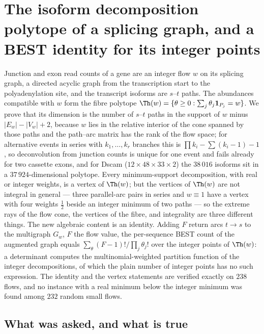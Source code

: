 \chapter[The isoform decomposition polytope]{The isoform decomposition polytope of a splicing graph, and a BEST identity for its integer points}\label{chap:ch17}
\begin{chaptersummary}
Junction and exon read counts of a gene are an integer flow $w$ on its splicing graph, a
directed acyclic graph from the transcription start to the polyadenylation site, and the
transcript isoforms are $s$--$t$ paths. The abundances compatible with $w$ form the fibre
polytope $\Th(w)=\{\theta\ge0:\sum_j\theta_j\mathbf 1_{P_j}=w\}$. We prove that its dimension
is the number of $s$--$t$ paths in the support of $w$ minus $|E_w|-|V_w|+2$, because $w$
lies in the relative interior of the cone spanned by those paths and the path--arc matrix has
the rank of the flow space; for alternative events in series with $k_1,\dots,k_r$ branches
this is $\prod k_i-\sum(k_i-1)-1$, so deconvolution from junction counts is unique for one
event and fails already for two cassette exons, and for Dscam ($12\times48\times33\times2$)
the $38\,016$ isoforms sit in a $37\,924$-dimensional polytope. Every minimum-support
decomposition, with real or integer weights, is a vertex of $\Th(w)$; but the vertices of
$\Th(w)$ are not integral in general --- three parallel-arc pairs in series and $w\equiv1$
have a vertex with four weights $\tfrac12$ beside an integer minimum of two paths --- so the
extreme rays of the flow cone, the vertices of the fibre, and integrality are three different
things. The new algebraic content is an identity. Adding $F$ return arcs $t\to s$ to the
multigraph $G_w$, $F$ the flow value, the per-sequence BEST count of the augmented graph
equals $\sum_\theta (F-1)!/\prod_j\theta_j!$ over the integer points of $\Th(w)$: a
determinant computes the multinomial-weighted partition function of the integer
decompositions, of which the plain number of integer points has no such expression. The
identity and the vertex statements are verified exactly on $238$ flows, and no instance with
a real minimum below the integer minimum was found among $232$ random small flows.
\end{chaptersummary}

\section{What was asked, and what is true}

